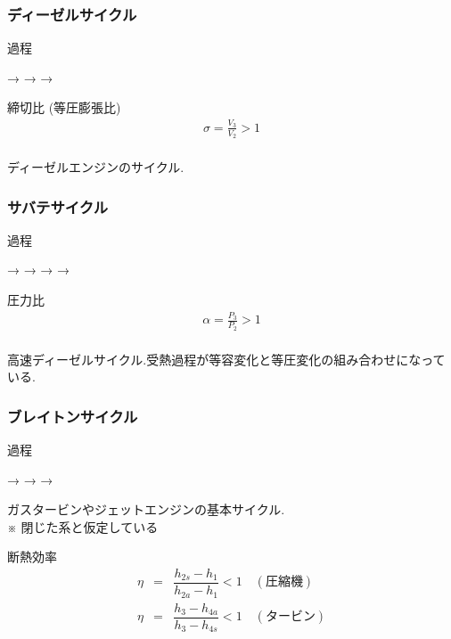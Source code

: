 \documentclass[a4paper]{jsarticle}
\begin{document}
\subsubsection{ディーゼルサイクル}
\begin{itembox}[l]{過程}
    \begin{center}
        \quad → \quad {} \quad → \quad {} \quad → \quad {}
    \end{center}
\end{itembox}
\begin{itembox}[l]{締切比 (等圧膨張比)}
    \begin{eqnarray*}
        \sigma=\frac{V_3}{V_2}>1\\
    \end{eqnarray*}
\end{itembox}
ディーゼルエンジンのサイクル.
\subsubsection{サバテサイクル}
\begin{itembox}[l]{過程}
    \begin{center}
        \quad → \quad {}\quad → \quad {} \quad → \quad {} \quad → \quad {}
    \end{center}
\end{itembox}
\begin{itembox}[l]{圧力比}
    \begin{eqnarray*}
        \alpha=\frac{P_3}{P_2}>1\\
    \end{eqnarray*}
\end{itembox}
高速ディーゼルサイクル.受熱過程が等容変化と等圧変化の組み合わせになっている.
\subsubsection{ブレイトンサイクル}
\begin{itembox}[l]{過程}
    \begin{center}
        \quad → \quad {} \quad → \quad {} \quad → \quad {}
    \end{center}
\end{itembox}
ガスタービンやジェットエンジンの基本サイクル.\\
※ 閉じた系と仮定している
\begin{itembox}[l]{断熱効率}
    \begin{eqnarray*}
        \eta &=& \dfrac{h_{2s}-h_1}{h_{2a}-h_1} <1 \quad (圧縮機)\\
        \eta &=& \dfrac{h_3-h_{4a}}{h_3-h_{4s}} <1 \quad (タービン)\\
    \end{eqnarray*}
\end{itembox}
\end{document}
